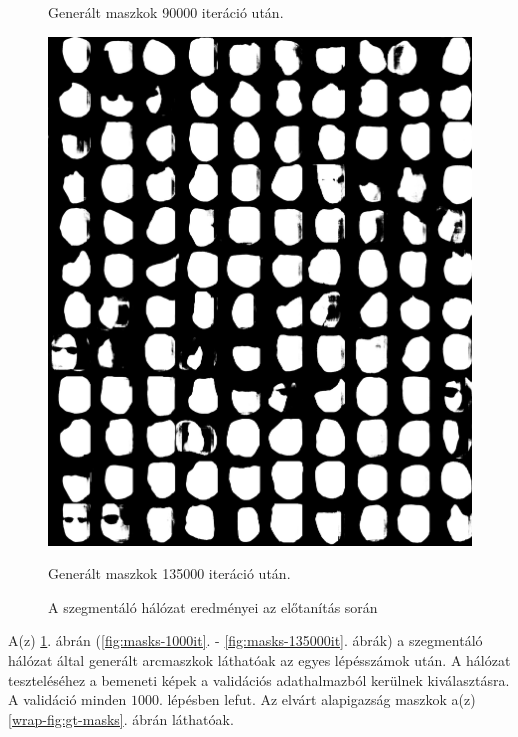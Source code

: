 \documentclass[12pt,a4]{article}
\begin{document}
\begin{figure}[h!]
\begin{minipage}[b]{0.4\textwidth}
            \caption{Generált maszkok 90000 iteráció után.}
            \label{fig:masks-90000it}
          \end{minipage}
          \hfill
          \begin{minipage}[b]{0.4\textwidth}
            \includegraphics[width=\textwidth]{test-masks-135000.png}
            \caption{Generált maszkok 135000 iteráció után.}
            \label{fig:masks-135000it}
          \end{minipage}
          \caption{\centering A szegmentáló hálózat eredményei az előtanítás során}
          \label{fig:pretrain-mask}
        \end{figure}

        
        
        A(z) \ref{fig:pretrain-mask}. ábrán (\ref{fig:masks-1000it}. - \ref{fig:masks-135000it}. ábrák) a szegmentáló hálózat által generált arcmaszkok láthatóak az egyes lépésszámok után. A hálózat teszteléséhez a bemeneti képek a validációs adathalmazból kerülnek kiválasztásra. A validáció minden $1000$. lépésben lefut. Az elvárt alapigazság maszkok a(z) \ref{wrap-fig:gt-masks}. ábrán láthatóak. 
\end{document}
